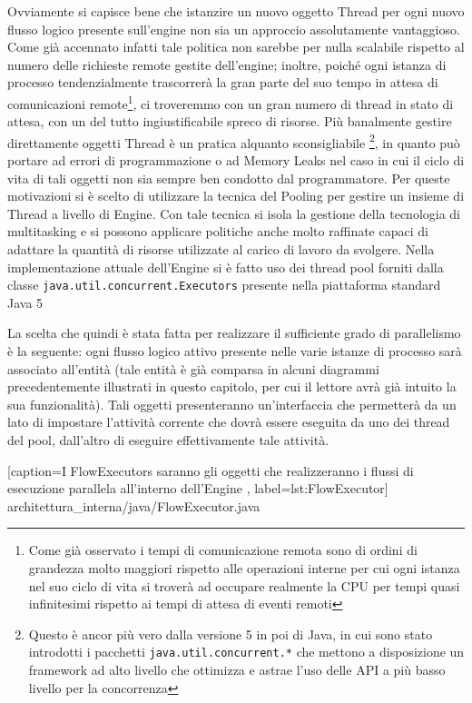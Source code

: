 Ovviamente si capisce bene che istanzire un nuovo oggetto Thread per ogni nuovo
flusso logico presente sull'engine non sia un approccio assolutamente
vantaggioso. Come già accennato infatti tale politica non sarebbe per nulla
scalabile rispetto al numero delle richieste remote gestite dell'engine; inoltre,
poiché ogni istanza di processo tendenzialmente trascorrerà la gran parte del suo
tempo in attesa di comunicazioni remote\footnote{Come già osservato i tempi di
comunicazione remota sono di ordini di grandezza molto maggiori rispetto alle
operazioni interne per cui ogni istanza nel suo ciclo di vita si troverà ad
occupare realmente la CPU per tempi quasi infinitesimi rispetto ai tempi di
attesa di eventi remoti}, ci troveremmo con un gran numero di thread in stato di
attesa, con un del tutto ingiustificabile spreco di risorse. Più banalmente
gestire direttamente oggetti Thread \`e un pratica alquanto sconsigliabile
\footnote{Questo \`e ancor pi\`u vero dalla versione 5 in poi di Java, in cui
sono stato introdotti i pacchetti \texttt{java.util.concurrent.*} che mettono a
disposizione un framework ad alto livello che ottimizza e astrae l'uso delle API
a più basso livello per la concorrenza}, in quanto può portare ad errori di
programmazione o ad Memory Leaks nel caso in cui il ciclo di vita di tali oggetti
non sia sempre ben condotto dal programmatore. Per queste motivazioni si \`e
scelto di utilizzare la tecnica del Pooling per gestire un insieme di Thread a
livello di Engine. Con tale tecnica si isola la gestione della tecnologia di
multitasking e si possono applicare politiche anche molto raffinate capaci di
adattare la quantità di risorse utilizzate al carico di lavoro da svolgere. Nella
implementazione attuale dell'Engine si \`e fatto uso dei thread pool forniti
dalla classe \texttt{java.util.concurrent.Executors} presente nella piattaforma
standard Java 5
 
La scelta che quindi \`e stata fatta per realizzare il sufficiente grado di
parallelismo \`e la seguente: ogni flusso logico attivo presente nelle varie istanze di
processo sarà associato all'entità  (tale entità \`e già
comparsa in alcuni diagrammi precedentemente illustrati in questo capitolo, per
cui il lettore avrà già intuito la sua funzionalità). Tali oggetti
presenteranno un'interfaccia che permetterà da un lato di impostare l'attività corrente che
dovrà essere eseguita da uno dei thread del pool, dall'altro di eseguire
effettivamente tale attività.


[caption={I FlowExecutors saranno gli oggetti che realizzeranno i flussi di
esecuzione parallela all'interno dell'Engine }, label=lst:FlowExecutor]
{architettura_interna/java/FlowExecutor.java}

